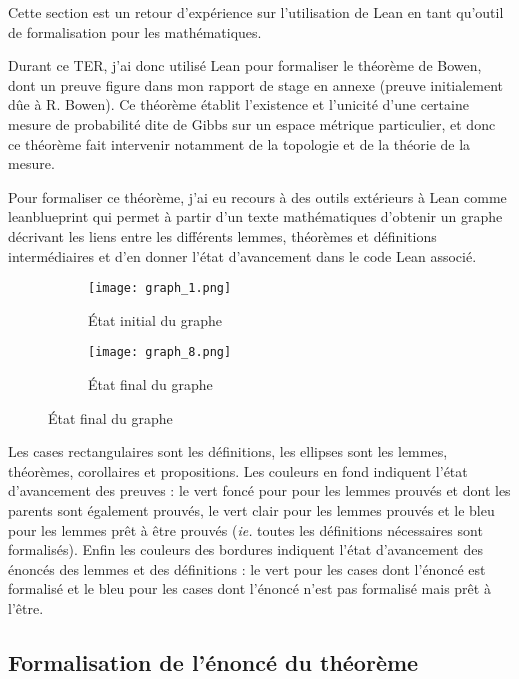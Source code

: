 \documentclass[../../rapport.tex]{subfiles}
\begin{document}
  Cette section est un retour d'expérience sur l'utilisation de Lean en tant qu'outil de formalisation pour les
  mathématiques.

  Durant ce TER, j'ai donc utilisé Lean pour formaliser le théorème de Bowen, dont un preuve figure dans mon rapport de stage
  en annexe (preuve initialement dûe à R. Bowen).
  Ce théorème établit l'existence et l'unicité d'une certaine mesure de probabilité dite de Gibbs sur un espace métrique particulier,
  et donc ce théorème fait intervenir notamment de la topologie et de la théorie de la mesure.

  Pour formaliser ce théorème, j'ai eu recours à des outils extérieurs à Lean comme
  leanblueprint \cite{leanblueprint}
  qui permet à partir d'un texte mathématiques d'obtenir un graphe décrivant les liens entre les différents lemmes,
  théorèmes et définitions intermédiaires et d'en donner l'état d'avancement dans le code Lean associé.

  \begin{figure}[h]
    \centering
    \begin{subfigure}{.55\textwidth}
      \centering
      \texttt{[image: graph\_1.png]}
      \caption{État initial du graphe}
    \end{subfigure}
    \begin{subfigure}{.43\textwidth}
      \centering
      \texttt{[image: graph\_8.png]}
      \caption{État final du graphe}
    \end{subfigure}
  \end{figure}

  \begin{spacing}{0.8}
  {\scriptsize
  Les cases rectangulaires sont les définitions, les ellipses sont les lemmes, théorèmes, corollaires et propositions.
  Les couleurs en fond indiquent l'état d'avancement des preuves :
  le vert foncé pour pour les lemmes prouvés et dont les parents sont également prouvés,
  le vert clair pour les lemmes prouvés
  et le bleu pour les lemmes prêt à être prouvés (\textit{ie.} toutes les définitions nécessaires sont formalisés).
  Enfin les couleurs des bordures indiquent l'état d'avancement des énoncés des lemmes et des définitions :
  le vert pour les cases dont l'énoncé est formalisé
  et le bleu pour les cases dont l'énoncé n'est pas formalisé mais prêt à l'être.}
  \end{spacing}

  \subsection{Formalisation de l'énoncé du théorème}
\end{document}
